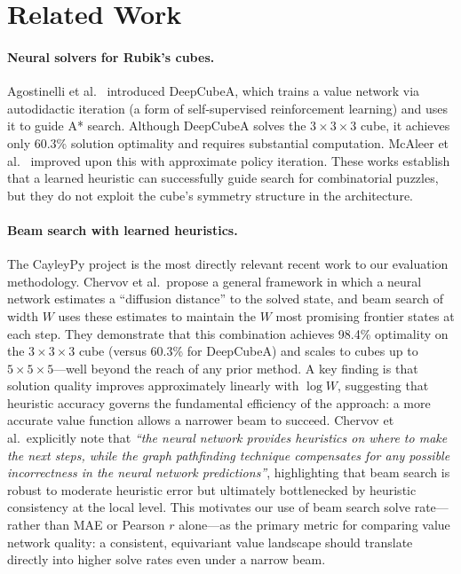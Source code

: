 \documentclass[11pt]{article}
\begin{document}
\section{Related Work}
\label{sec:related}

\paragraph{Neural solvers for Rubik's cubes.}
Agostinelli et al.~\cite{agostinelli2019solving} introduced DeepCubeA, which
trains a value network via autodidactic iteration (a form of self-supervised
reinforcement learning) and uses it to guide A* search.
Although DeepCubeA solves the $3{\times}3{\times}3$ cube, it achieves only
60.3\% solution optimality and requires substantial computation.
McAleer et al.~\cite{mcaleer2019solving} improved upon this with approximate
policy iteration.
These works establish that a learned heuristic can successfully guide search
for combinatorial puzzles, but they do not exploit the cube's symmetry
structure in the architecture.

\paragraph{Beam search with learned heuristics.}
The CayleyPy project \cite{chervov2025cayleypy} is the most directly relevant
recent work to our evaluation methodology.
Chervov et al.\ propose a general framework in which a neural network estimates
a ``diffusion distance'' to the solved state, and beam search of width
$W$ uses these estimates to maintain the $W$ most promising frontier states at
each step.
They demonstrate that this combination achieves 98.4\% optimality on the
$3{\times}3{\times}3$ cube (versus 60.3\% for DeepCubeA) and scales to cubes
up to $5{\times}5{\times}5$—well beyond the reach of any prior method.
A key finding is that solution quality improves approximately linearly with
$\log W$, suggesting that heuristic accuracy governs the fundamental
efficiency of the approach: a more accurate value function allows a narrower
beam to succeed.
Chervov et al.\ explicitly note that \emph{``the neural network provides
heuristics on where to make the next steps, while the graph pathfinding
technique compensates for any possible incorrectness in the neural network
predictions''}, highlighting that beam search is robust to moderate heuristic
error but ultimately bottlenecked by heuristic consistency at the local level.
This motivates our use of beam search solve rate—rather than MAE or Pearson
$r$ alone—as the primary metric for comparing value network quality: a
consistent, equivariant value landscape should translate directly into higher
solve rates even under a narrow beam.
\end{document}
